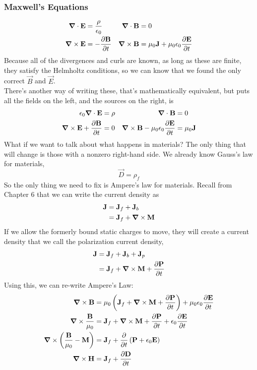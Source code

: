 \documentclass[a4paper]{article}
\begin{document}
\subsubsection{Maxwell's Equations}
\begin{align*}
	\boldsymbol{\mathbf{\nabla}} \cdot \boldsymbol{\mathbf{E}} &= \frac{\rho}{\epsilon_0} &
	\boldsymbol{\mathbf{\nabla}} \cdot \boldsymbol{\mathbf{B}} &= 0\\
	\boldsymbol{\mathbf{\nabla}} \times \boldsymbol{\mathbf{E}} &= -\frac{\partial \boldsymbol{\mathbf{B}}}{\partial t} &
	\boldsymbol{\mathbf{\nabla}} \times \boldsymbol{\mathbf{B}} &= \mu_0\boldsymbol{\mathbf{J}} + \mu_0\epsilon_0\frac{\partial \boldsymbol{\mathbf{E}}}{\partial t}
\end{align*}
Because all of the divergences and curls are known, as long as these are
finite, they satisfy the Helmholtz conditions, so we can know that we found
the only correct $\vec{B}$ and $\vec{E}$.\\
There's another way of writing these, that's mathematically equivalent, but
puts all the fields on the left, and the sources on the right, is
\begin{align*}
	\epsilon_0\boldsymbol{\mathbf{\nabla}}\cdot\boldsymbol{\mathbf{E}} &= \rho &
	\boldsymbol{\mathbf{\nabla}}\cdot\boldsymbol{\mathbf{B}} &= 0\\
	\boldsymbol{\mathbf{\nabla}}\times\boldsymbol{\mathbf{E}} + \frac{\partial \boldsymbol{\mathbf{B}}}{\partial t} &= 0 &
	\boldsymbol{\mathbf{\nabla}}\times\boldsymbol{\mathbf{B}} - \mu_0\epsilon_0\frac{\partial \boldsymbol{\mathbf{E}}}{\partial t} &= \mu_0\boldsymbol{\mathbf{J}}
\end{align*}
What if we want to talk about what happens in materials? The only thing that
will change is those with a nonzero right-hand side. We already know Gauss's
law for materials,
\[ \vec{D} = \rho_f \]
So the only thing we need to fix is Ampere's law for materials. Recall from
Chapter 6 that we can write the current density as
\begin{align*}
	\boldsymbol{\mathbf{J}} &= \boldsymbol{\mathbf{J}}_f + \boldsymbol{\mathbf{J}}_b\\
		&= \boldsymbol{\mathbf{J}}_f + \boldsymbol{\mathbf{\nabla}}\times\boldsymbol{\mathbf{M}}
\end{align*}
If we allow the formerly bound static charges to move, they will create a
current density that we call the polarization current density,
\begin{align*}
	\boldsymbol{\mathbf{J}} &= \boldsymbol{\mathbf{J}}_f + \boldsymbol{\mathbf{J}}_b + \boldsymbol{\mathbf{J}}_p\\
		&= \boldsymbol{\mathbf{J}}_f + \boldsymbol{\mathbf{\nabla}}\times\boldsymbol{\mathbf{M}} + \frac{\partial \boldsymbol{\mathbf{P}}}{\partial t}
\end{align*}
Using this, we can re-write Ampere's Law:
\begin{align*}
	\del\times\vec{B} &=
	\mu_0\left(\vec{J}_f + \del\times\vec{M} + \pder{\vec{P}}{t}\right)
	+ \mu_0\epsilon_0 \pder{\vec{E}}{t}\\
	\del\times\frac{\vec{B}}{\mu_0} &= \vec{J}_f + \del\times\vec{M} +
		\pder{\vec{P}}{t} + \epsilon_0\pder{\vec{E}}{t}\\
	\del\times\left(\frac{\vec{B}}{\mu_0}-\vec{M}\right) &=
		\vec{J}_f + \pd{t}\left(\vec{P} + \epsilon_0\vec{E}\right)\\
	\del\times\vec{H} &= \vec{J}_f + \pder{\vec{D}}{t}
\end{align*}
\end{document}
